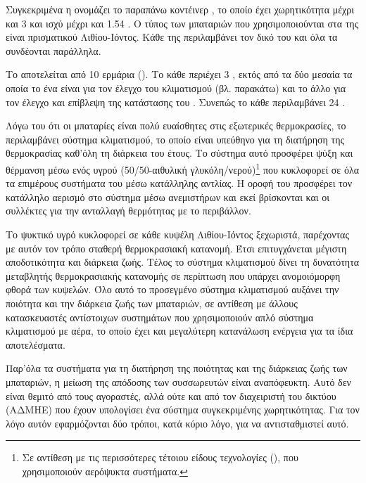 \documentclass[12pt]{report}
\begin{document}
Συγκεκριμένα η {} ονομάζει το παραπάνω κοντέινερ {}, το οποίο έχει χωρητικότητα μέχρι και 3 {} και ισχύ μέχρι και 1.54 {}. Ο τύπος των μπαταριών που χρησιμοποιούνται
στα {} της είναι πρισματικού Λιθίου-Ιόντος. Κάθε {} της {} περιλαμβάνει τον δικό του {} και όλα τα {} συνδέονται παράλληλα. 

Το {} αποτελείται από 10 ερμάρια ({}). Το κάθε {} περιέχει 3 {}, εκτός από τα δύο μεσαία τα οποία το ένα είναι για τον έλεγχο του κλιματισμού 
(βλ. παρακάτω) και το άλλο για τον έλεγχο και επίβλεψη της κατάστασης του {}. Συνεπώς το κάθε {} περιλαμβάνει 24 {}.

Λόγω του ότι οι μπαταρίες είναι πολύ ευαίσθητες στις εξωτερικές θερμοκρασίες, το {} περιλαμβάνει σύστημα κλιματισμού, το οποίο είναι υπεύθηνο για τη διατήρηση της θερμοκρασίας καθ'όλη τη διάρκεια του έτους. 
Το σύστημα αυτό προσφέρει ψύξη και θέρμανση μέσω ενός υγρού (50/50-αιθυλική γλυκόλη/νερού)\footnote{Σε αντίθεση με τις περισσότερες τέτοιου είδους τεχνολογίες ({}), που χρησιμοποιούν 
αερόψυκτα συστήματα.} που κυκλοφορεί σε όλα τα επιμέρους συστήματα του {} μέσω κατάλληλης αντλίας. Η οροφή του {} προσφέρει τον κατάλληλο αερισμό στο σύστημα μέσω ανεμιστήρων και εκεί 
βρίσκονται και οι συλλέκτες για την ανταλλαγή θερμότητας με το περιβάλλον.

Το ψυκτικό υγρό κυκλοφορεί σε κάθε κυψέλη Λιθίου-Ιόντος ξεχωριστά, παρέχοντας με αυτόν τον τρόπο σταθερή θερμοκρασιακή κατανομή. Έτσι επιτυγχάνεται μέγιστη αποδοτικότητα και διάρκεια ζωής. Τέλος το σύστημα κλιματισμού 
δίνει τη δυνατότητα μεταβλητής θερμοκρασιακής κατανομής σε περίπτωση που υπάρχει ανομοιόμορφη φθορά των κυψελών. Όλο αυτό το προσεγμένο σύστημα κλιματισμού αυξάνει την ποιότητα και την
διάρκεια ζωής των μπαταριών, σε αντίθεση με άλλους κατασκευαστές αντίστοιχων συστημάτων που χρησιμοποιούν απλό σύστημα κλιματισμού με αέρα, το οποίο έχει και μεγαλύτερη κατανάλωση ενέργεια για τα ίδια αποτελέσματα.

Παρ'όλα τα συστήματα για τη διατήρηση της ποιότητας και της διάρκειας ζωής των μπαταριών, η μείωση της απόδοσης των συσσωρευτών είναι αναπόφευκτη. Αυτό δεν είναι θεμιτό από τους αγοραστές, αλλά ούτε και από τον διαχειριστή του 
δικτύου (ΑΔΜΗΕ) που έχουν υπολογίσει ένα σύστημα συγκεκριμένης χωρητικότητας. Για τον λόγο αυτόν εφαρμόζονται δύο τρόποι, κατά κύριο λόγο, για να αντισταθμιστεί αυτό. 
\end{document}
